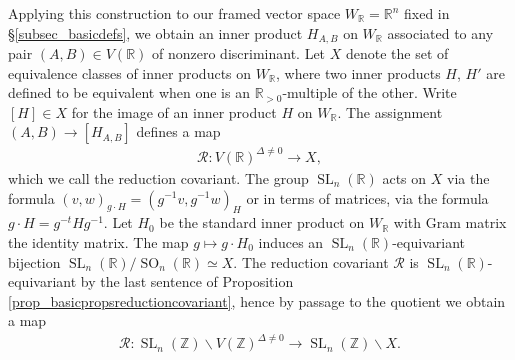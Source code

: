 \documentclass{article} %
\numberwithin{equation}{section}
\DeclareMathOperator{\SL}{SL}
\DeclareMathOperator{\SO}{SO}
\newcommand{\R}{\mathbb{R}}
\newcommand{\Z}{\mathbb{Z}}
\begin{document}
Applying this construction to our framed vector space $W_{\R} =\R^n$ fixed in \S\ref{subsec_basicdefs}, we obtain an inner product $H_{A,B}$ on $W_{\R}$ associated to any pair $(A,B)\in V(\R)$ of nonzero discriminant.
Let $X$ denote the set of equivalence classes of inner products on $W_{\R}$, where two inner products $H$, $H'$ are defined to be equivalent when one is an $\R_{>0}$-multiple of the other.
Write $[H] \in X$ for the image of an inner product $H$ on $W_{\R}$.
The assignment $(A,B)\rightarrow [H_{A,B}]$ defines a map 
\begin{align}
    \mathcal{R}\colon V(\R)^{\Delta\neq 0} \rightarrow X,
\end{align}
which we call the reduction covariant.
The group $\SL_n(\R)$ acts on $X$ via the formula $(v,w)_{g\cdot H} = (g^{-1}v,g^{-1}w)_{H}$ or in terms of matrices, via the formula $g\cdot H = g^{-t} H g^{-1}$.
Let $H_0$ be the standard inner product on $W_{\R}$ with Gram matrix the identity matrix.
The map $g\mapsto g\cdot H_0$ induces an $\SL_n(\R)$-equivariant bijection $\SL_n(\R)/\SO_n(\R) \simeq X$.
The reduction covariant $\mathcal{R}$ is $\SL_n(\R)$-equivariant by the last sentence of Proposition \ref{prop_basicpropsreductioncovariant}, hence by passage to the quotient we obtain a map 
\begin{align}\label{equation: reduction covariant integral orbits}
    \mathcal{R}\colon \SL_n(\Z)\backslash V(\Z)^{\Delta\neq 0} \rightarrow \SL_n(\Z) \backslash X.
\end{align}
\end{document}

